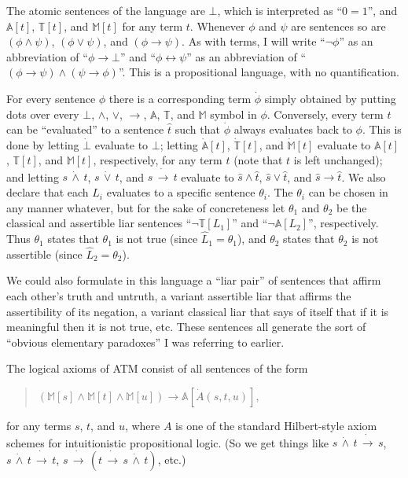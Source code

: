 \documentclass{amsart}
\theoremstyle{definition}
\begin{document}
The atomic sentences of the language are $\bot$, which is interpreted as ``$0 = 1$'', and $\mathbb{A}[t]$, $\mathbb{T}[t]$, and $\mathbb{M}[t]$ for any term $t$. Whenever $\phi$ and $\psi$ are sentences so are $(\phi \wedge \psi)$, $(\phi \vee \psi)$, and $(\phi \to \psi)$. As with terms, I will write ``$\neg\phi$'' as an abbreviation of ``$\phi \to \bot$'' and ``$\phi \leftrightarrow \psi$'' as an abbreviation of ``$(\phi \to \psi) \wedge (\psi \to \phi)$''. This is a propositional language, with no quantification.

For every sentence $\phi$ there is a corresponding term $\dot{\phi}$ simply obtained by putting dots over every $\bot$, $\wedge$, $\vee$, $\to$, $\mathbb{A}$, $\mathbb{T}$, and $\mathbb{M}$ symbol in $\phi$. Conversely, every term $t$ can be ``evaluated'' to a sentence $\hat{t}$ such that $\dot{\phi}$ always evaluates back to $\phi$. This is done by letting $\dot{\bot}$ evaluate to $\bot$; letting $\dot{\mathbb{A}}[t]$, $\dot{\mathbb{T}}[t]$, and $\dot{\mathbb{M}}[t]$ evaluate to $\mathbb{A}[t]$, $\mathbb{T}[t]$, and $\mathbb{M}[t]$, respectively, for any term $t$ (note that $t$ is left unchanged); and letting $s\, \dot{\wedge}\, t$, $s\, \dot{\vee}\, t$, and $s\, \dot{\to}\, t$ evaluate to $\hat{s} \wedge \hat{t}$, $\hat{s} \vee \hat{t}$, and $\hat{s} \to \hat{t}$. We also declare that each $L_i$ evaluates to a specific sentence $\theta_i$. The $\theta_i$ can be chosen in any manner whatever, but for the sake of concreteness let $\theta_1$ and $\theta_2$ be the classical and assertible liar sentences ``$\neg\mathbb{T}[L_1]$'' and ``$\neg\mathbb{A}[L_2]$'', respectively. Thus $\theta_1$ states that $\theta_1$ is not true (since $\hat{L}_1 = \theta_1$), and $\theta_2$ states that $\theta_2$ is not assertible (since $\hat{L}_2 = \theta_2$).

We could also formulate in this language a ``liar pair'' of sentences that affirm each other's truth and untruth, a variant assertible liar that affirms the assertibility of its negation, a variant classical liar that says of itself that if it is  meaningful then it is not true, etc. These sentences all generate the sort of ``obvious elementary paradoxes'' I was referring to earlier.

The logical axioms of ATM consist of all sentences of the form

\begin{quote}
  $(\mathbb{M}[s] \wedge \mathbb{M}[t] \wedge \mathbb{M}[u]) \to \mathbb{A}[\dot{A}(s, t, u)]$,
\end{quote}
for any terms $s$, $t$, and $u$, where $A$ is one of the standard Hilbert-style axiom schemes for intuitionistic propositional logic. (So we get things like $s \,\dot{\wedge}\, t\, \dot{\to}\, s$, $s \,\dot{\wedge}\, t \,\dot{\to}\, t$, $s \,\dot{\to}\, (t \,\dot{\to}\, s \,\dot{\wedge}
\,t)$, etc.)
\end{document}
